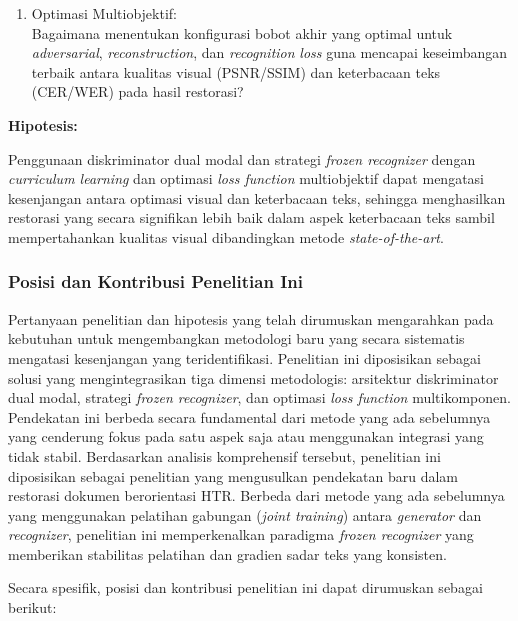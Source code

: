 \begin{enumerate}[leftmargin=*, labelindent=0pt, itemsep=1ex, topsep=0pt]
\begin{enumerate}[leftmargin=1.5em, labelsep=0.5em, itemindent=0pt, label=\arabic*., topsep=0pt, parsep=0pt, itemsep=0pt]
      \item Optimasi Multiobjektif: \\
            Bagaimana menentukan konfigurasi bobot akhir yang optimal untuk \textit{adversarial}, \textit{reconstruction}, dan \textit{recognition} \textit{loss} guna mencapai keseimbangan terbaik antara kualitas visual (PSNR/SSIM) dan keterbacaan teks (CER/WER) pada hasil restorasi?
\end{enumerate}


\noindent\textbf{Hipotesis:}



Penggunaan diskriminator dual modal dan strategi \textit{frozen recognizer} dengan \textit{curriculum learning} dan optimasi \textit{loss function} multiobjektif dapat mengatasi kesenjangan antara optimasi visual dan keterbacaan teks, sehingga menghasilkan restorasi yang secara signifikan lebih baik dalam aspek keterbacaan teks sambil mempertahankan kualitas visual dibandingkan metode \textit{state-of-the-art}.

\end{enumerate}

\subsubsection{Posisi dan Kontribusi Penelitian Ini}
\label{subsubsec:research-positioning}

Pertanyaan penelitian dan hipotesis yang telah dirumuskan mengarahkan pada kebutuhan untuk mengembangkan metodologi baru yang secara sistematis mengatasi kesenjangan yang teridentifikasi. Penelitian ini diposisikan sebagai solusi yang mengintegrasikan tiga dimensi metodologis: arsitektur diskriminator dual modal, strategi \textit{frozen recognizer}, dan optimasi \textit{loss function} multikomponen. Pendekatan ini berbeda secara fundamental dari metode yang ada sebelumnya yang cenderung fokus pada satu aspek saja atau menggunakan integrasi yang tidak stabil. Berdasarkan analisis komprehensif tersebut, penelitian ini diposisikan sebagai penelitian yang mengusulkan pendekatan baru dalam restorasi dokumen berorientasi HTR. Berbeda dari metode yang ada sebelumnya yang menggunakan pelatihan gabungan (\textit{joint training}) antara \textit{generator} dan \textit{recognizer}, penelitian ini memperkenalkan paradigma \textit{frozen recognizer} yang memberikan stabilitas pelatihan dan gradien sadar teks yang konsisten.

Secara spesifik, posisi dan kontribusi penelitian ini dapat dirumuskan sebagai berikut:

